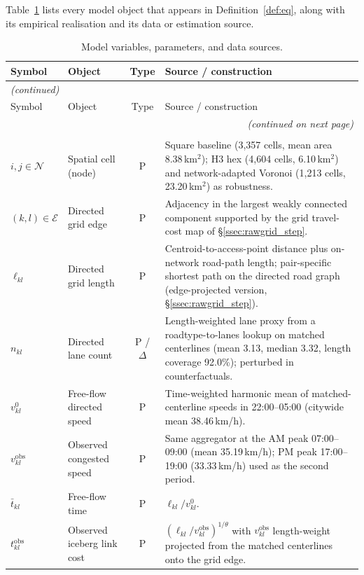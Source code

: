 \documentclass[12pt]{article}
\newcommand{\N}{\mathcal N}
\newcommand{\E}{\mathcal E}
\newcommand{\tbar}{\bar t}
\newcommand{\tkl}{t_{kl}}
\newcommand{\obs}{\mathrm{obs}}
\begin{document}
Table~\ref{tab:inventory} lists every model object that appears in
Definition~\ref{def:eq}, along with its empirical realisation and
its data or estimation source.

\begin{small}
\begin{longtable}{p{2.0cm}p{4.4cm}cp{6.3cm}}
\caption{Model variables, parameters, and data sources.}
\label{tab:inventory}\\
\toprule
Symbol & Object & Type & Source / construction \\
\midrule
\endfirsthead
\multicolumn{4}{l}{\emph{(continued)}}\\
\toprule
Symbol & Object & Type & Source / construction \\
\midrule
\endhead
\midrule
\multicolumn{4}{r}{\emph{(continued on next page)}}\\
\endfoot
\bottomrule
\endlastfoot
\multicolumn{4}{l}{\textbf{A. Spatial primitives}}\\
$i,j\in\N$ & Spatial cell (node) & P & Square baseline (3{,}357 cells, mean area 8.38\,km$^2$); H3 hex (4{,}604 cells, 6.10\,km$^2$) and network-adapted Voronoi (1{,}213 cells, 23.20\,km$^2$) as robustness.\\
$(k,l)\in\E$ & Directed grid edge & P & Adjacency in the largest weakly connected component supported by the grid travel-cost map of \S\ref{ssec:rawgrid_step}.\\
$\ell_{kl}$ & Directed grid length & P & Centroid-to-access-point distance plus on-network road-path length; pair-specific shortest path on the directed road graph (edge-projected version, \S\ref{ssec:rawgrid_step}).\\
$n_{kl}$ & Directed lane count & P / $\Delta$ & Length-weighted lane proxy from a roadtype-to-lanes lookup on matched centerlines (mean 3.13, median 3.32, length coverage 92.0\%); perturbed in counterfactuals.\\
$v^{0}_{kl}$ & Free-flow directed speed & P & Time-weighted harmonic mean of matched-centerline speeds in 22:00--05:00 (citywide mean 38.46\,km/h).\\
$v^{\obs}_{kl}$ & Observed congested speed & P & Same aggregator at the AM peak 07:00--09:00 (mean 35.19\,km/h); PM peak 17:00--19:00 (33.33\,km/h) used as the second period.\\
$\tbar_{kl}$ & Free-flow time & P & $\ell_{kl}/v^{0}_{kl}$.\\
$\tkl^{\obs}$ & Observed iceberg link cost & P & $(\ell_{kl}/v_{kl}^{\obs})^{1/\theta}$ with $v_{kl}^{\obs}$ length-weight projected from the matched centerlines onto the grid edge.\\

\end{longtable}
\end{small}
\end{document}
